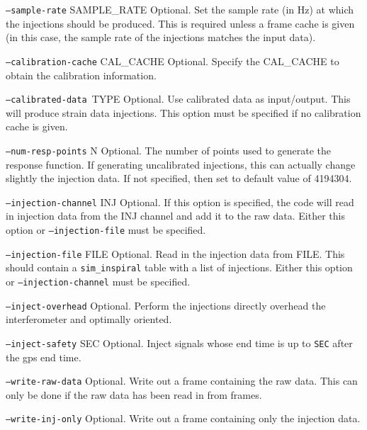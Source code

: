 \begin{entry}
\begin{entry}
\item[\texttt{--sample-rate} \textsc{SAMPLE\_RATE}] Optional.  Set the
sample rate (in Hz) at which the injections should be produced.  This is
required unless a frame cache is given (in this case, the sample rate of
the injections matches the input data).


\item[\texttt{--calibration-cache} \textsc{CAL\_CACHE}] Optional.
Specify the \textsc{CAL\_CACHE} to obtain the calibration information.

\item[\texttt{--calibrated-data }\textsc{TYPE}]  Optional.  Use
calibrated data as input/output.  This will produce strain data
injections.  This option must be specified if no calibration cache is
given.  
  
\item[\texttt{--num-resp-points} \textsc{N}] Optional.  The number of
points used to generate the response function.  If generating
uncalibrated injections, this can actually change slightly the injection
data.  If not specified, then set to default value of 4194304.
 
\item[\texttt{--injection-channel} \textsc{INJ}] Optional.  If this
option is specified, the code will read in injection data from the INJ
channel and add it to the raw data.  Either this option or
\texttt{--injection-file} must be specified.
 
\item[\texttt{--injection-file} \textsc{FILE}] Optional. Read in the
injection data from \textsc{FILE}.  This should contain a
\texttt{sim\_inspiral} table with a list of injections.  Either this
option or \texttt{--injection-channel} must be specified.

\item[\texttt{--inject-overhead}] Optional.  Perform the injections
directly overhead the interferometer and optimally oriented.

\item[\texttt{--inject-safety} \textsc{SEC}] Optional.  Inject signals
whose end time is up to \texttt{SEC} after the gps end time.
 
\item[\texttt{--write-raw-data}]  Optional.  Write out a frame
containing the raw data.  This can only be done if the raw data has been
read in from frames.

\item[\texttt{--write-inj-only}]  Optional.  Write out a frame
containing only the injection data.


\end{entry}
\end{entry}
